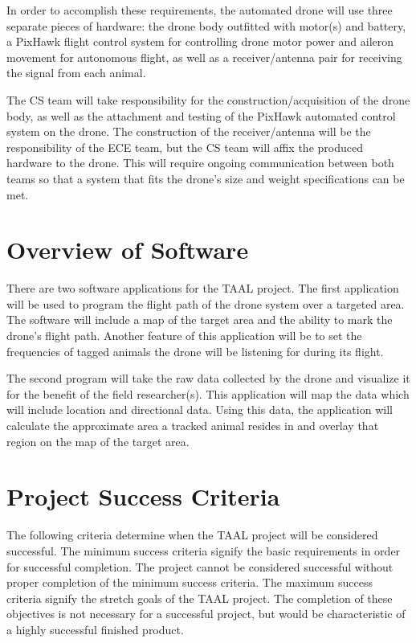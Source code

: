 \documentclass[onecolumn, draftclsnofoot,10pt, compsoc]{IEEEtran}
\begin{document}
In order to accomplish these requirements, the automated drone will use three separate pieces of hardware: the drone body outfitted with motor(s) and battery, a PixHawk flight control system for controlling drone motor power and aileron movement for autonomous flight, as well as a receiver/antenna pair for receiving the signal from each animal.

The CS team will take responsibility for the construction/acquisition of the drone body, as well as the attachment and testing of the PixHawk automated control system on the drone. The construction of the receiver/antenna will be the responsibility of the ECE team, but the CS team will affix the produced hardware to the drone. This will require ongoing communication between both teams so that a system that fits the drone’s size and weight specifications can be met.


\section{Overview of Software}

There are two software applications for the TAAL project. The first application will be used to program the flight path of the drone system over a targeted area. The software will include a map of the target area and the ability to mark the drone’s flight path. Another feature of this application will be to set the frequencies of tagged animals the drone will be listening for during its flight.

The second program will take the raw data collected by the drone and visualize it for the benefit of the field researcher(s). This application will map the data which will include location and directional data. Using this data, the application will calculate the approximate area a tracked animal resides in and overlay that region on the map of the target area. 

\section{Project Success Criteria}
The following criteria determine when the TAAL project will be considered successful. The minimum success criteria signify the basic requirements in order for successful completion. The project cannot be considered successful without proper completion of the minimum success criteria. The maximum success criteria signify the stretch goals of the TAAL project. The completion of these objectives is not necessary for a successful project, but would be characteristic of a highly successful finished product.
\end{document}
